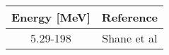 \begin{tabular}{c c} 
    \toprule 
    \bf{Energy [MeV]} & \bf{Reference} \\
    \midrule
    5.29-198 & Shane et al\\
    \bottomrule
\end{tabular}
